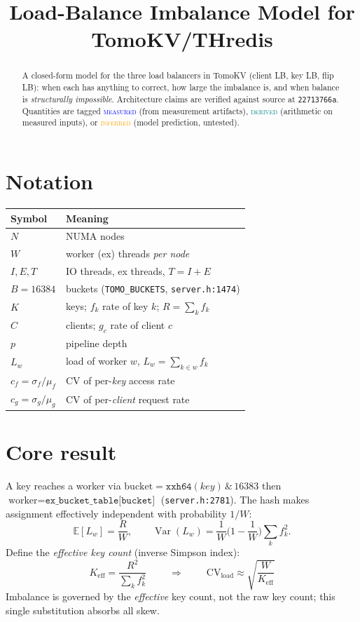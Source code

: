 \documentclass[11pt]{article}
\title{Load-Balance Imbalance Model for TomoKV/THredis}
\author{}
\date{}
\newcommand{\meas}{\textcolor{blue}{\textsc{measured}}}
\newcommand{\derv}{\textcolor{teal}{\textsc{derived}}}
\newcommand{\infr}{\textcolor{orange}{\textsc{inferred}}}
\begin{document}
\maketitle

\begin{abstract}
A closed-form model for the three load balancers in TomoKV (client LB, key LB, flip LB):
when each has anything to correct, how large the imbalance is, and when balance is
\emph{structurally impossible}. Architecture claims are verified against source at
\texttt{22713766a}. Quantities are tagged \meas{} (from measurement artifacts),
\derv{} (arithmetic on measured inputs), or \infr{} (model prediction, untested).
\end{abstract}

\section{Notation}
\begin{center}
\begin{tabular}{ll}
\toprule
Symbol & Meaning \\
\midrule
$N$ & NUMA nodes \\
$W$ & worker (ex) threads \emph{per node} \\
$I,E,T$ & IO threads, ex threads, $T=I+E$ \\
$B=16384$ & buckets (\texttt{TOMO\_BUCKETS}, \texttt{server.h:1474}) \\
$K$ & keys; $f_k$ rate of key $k$; $R=\sum_k f_k$ \\
$C$ & clients; $g_c$ rate of client $c$ \\
$p$ & pipeline depth \\
$L_w$ & load of worker $w$, $L_w=\sum_{k\in w} f_k$ \\
$c_f=\sigma_f/\mu_f$ & CV of per-\emph{key} access rate \\
$c_g=\sigma_g/\mu_g$ & CV of per-\emph{client} request rate \\
\bottomrule
\end{tabular}
\end{center}

\section{Core result}
A key reaches a worker via $\text{bucket}=\texttt{xxh64}(key)\,\&\,16383$ then
$\text{worker}=\texttt{ex\_bucket\_table[bucket]}$ (\texttt{server.h:2781}). The hash makes
assignment effectively independent with probability $1/W$:
\[
\mathbb{E}[L_w]=\frac{R}{W},\qquad
\operatorname{Var}(L_w)=\frac{1}{W}\Big(1-\frac{1}{W}\Big)\sum_k f_k^2 .
\]
Define the \emph{effective key count} (inverse Simpson index):
\[
\boxed{\;K_{\mathrm{eff}}=\frac{R^2}{\sum_k f_k^2}\;}
\qquad\Longrightarrow\qquad
\boxed{\;\mathrm{CV}_{\mathrm{load}}\approx\sqrt{\frac{W}{K_{\mathrm{eff}}}}\;}
\]
Imbalance is governed by the \emph{effective} key count, not the raw key count; this single
substitution absorbs all skew.
\end{document}

